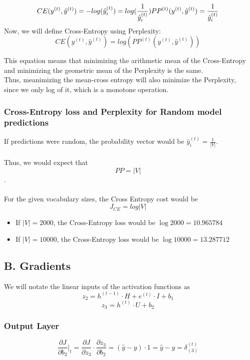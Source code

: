 \documentclass{article}
\begin{document}
$$
CE(y^{(t)} , \hat y^{(t)} ) = -log(\hat y_i^{(t)}) = log (\frac {1} {\hat y_i^{(t)}}) \\
PP^{(t)}(y^{(t)} , \hat y^{(t)} ) = \frac {1} {\hat y_i^{(t)}}
$$
Now, we will define Cross-Entropy using Perplexity:
$$
CE(y^{(t)} , \hat y^{(t)} ) = log (PP^{(t)}(y^{(t)} , \hat y^{(t)} ))
$$

This equation means that minimizing the arithmetic mean of the Cross-Entropy and minimizing the geometric mean of the Perplexity is the same.\\

Thus, meanimizing the mean-cross entropy will also minimize the Perplexity, since we only log of it, which is a monotone operation.

\subsubsection*{Cross-Entropy loss and Perplexity for \textbf{Random} model predictions}
If predictions were random, the probability vector would be $\hat y_i^{(t)} = \frac {1} {|V|} $. \\~\\
Thus, we would expect that $$ PP = |V| $$. \\~\\
For the given vocabulary sizes, the Cross Entropy cost would be $$ J_{CE} =  log |V| $$
\begin{itemize}
\item If $|V| = 2000$, the Cross-Entropy loss would be $  \log 2000 =  10.965784$
\item If $|V| = 10000$, the Cross-Entropy loss would be $ \log 10000 = 13.287712 $
\end{itemize}


\subsection*{B. Gradients}
 We will notate the linear inputs of the activation functions as $$ z_2 = h^{(t-1)}\cdot H + e^{(t)}\cdot I+ b_1 $$ $$ z_3 = h^{(t)} \cdot U + b_2$$

\subsubsection*{Output Layer}
$$
	\frac {\partial J}{\partial b_2} \Big|_t = \frac {\partial J}{\partial z_3} \cdot \frac {\partial z_3}{\partial b_2} = (\hat y - y) \cdot 1 = \hat y - y = \delta_{(3)}^{(t)}
$$
\end{document}
